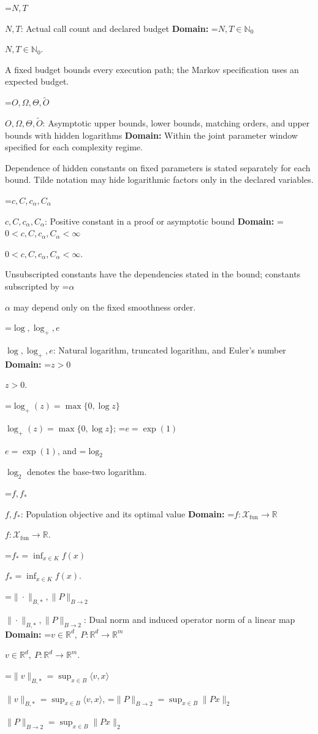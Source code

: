 \documentclass[10pt,a4paper]{article}
\newcommand{\AtlasMath}[1]{\par\begingroup\centering\setbox0=\hbox{$\displaystyle #1$}\ifdim\wd0>1.4\linewidth\typeout{ATLAS WIDE FORMULA: \the\wd0}\fi\ifdim\wd0>\linewidth\resizebox{\linewidth}{!}{\box0}\else\box0\fi\par\endgroup}
\newcommand{\AtlasInlineMath}[1]{\begingroup\setbox0=\hbox{$#1$}\ifdim\wd0>.4\linewidth\endgroup\AtlasMath{#1}\else\endgroup$#1$\fi}
\begin{document}
\AtlasInlineMath{N,T}: Actual call count and declared budget \textbf{Domain:} \AtlasInlineMath{N,T\in\mathbb{N}_0}.



A fixed budget bounds every execution path; the Markov specification uses an expected budget.



\AtlasInlineMath{O,\Omega,\Theta,\widetilde{O}}: Asymptotic upper bounds, lower bounds, matching orders, and upper bounds with hidden logarithms \textbf{Domain:} Within the joint parameter window specified for each complexity regime.



Dependence of hidden constants on fixed parameters is stated separately for each bound. Tilde notation may hide logarithmic factors only in the declared variables.



\AtlasInlineMath{c,C,c_\alpha,C_\alpha}: Positive constant in a proof or asymptotic bound \textbf{Domain:} \AtlasInlineMath{0<c,C,c_\alpha,C_\alpha<\infty}.



Unsubscripted constants have the dependencies stated in the bound; constants subscripted by \AtlasInlineMath{\alpha} may depend only on the fixed smoothness order.



\AtlasInlineMath{\log,\log_+,e}: Natural logarithm, truncated logarithm, and Euler's number \textbf{Domain:} \AtlasInlineMath{z>0}.



\AtlasInlineMath{\log_+(z)=\max\{0,\log z\}}; \AtlasInlineMath{e=\exp(1)}, and \AtlasInlineMath{\log_2} denotes the base-two logarithm.



\AtlasInlineMath{f,f_*}: Population objective and its optimal value \textbf{Domain:} \AtlasInlineMath{f:\mathcal{X}_{\mathrm{fun}}\to\mathbb{R}}.



\AtlasInlineMath{f_*=\inf_{x\in K}f(x)}.



\AtlasInlineMath{\|\cdot\|_{B,*},\|P\|_{B\to2}}: Dual norm and induced operator norm of a linear map \textbf{Domain:} \AtlasInlineMath{v\in\mathbb{R}^d,\ P:\mathbb{R}^d\to\mathbb{R}^m}.



\AtlasInlineMath{\|v\|_{B,*}=\sup_{x\in B}\langle v,x\rangle}, \AtlasInlineMath{\|P\|_{B\to2}=\sup_{x\in B}\|Px\|_2}
\end{document}
